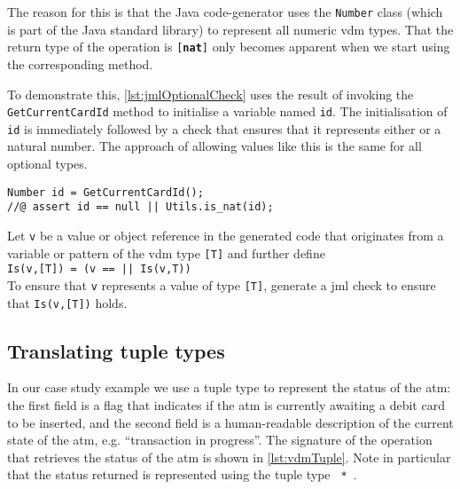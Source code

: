 \noindent The reason for this is that the Java code-generator uses the
\texttt{Number} class (which is part of the Java standard library) to
represent all numeric \ac{vdm} types. That the return type of the
operation is \texttt{[\textbf{nat}]} only becomes apparent when we
start using the corresponding method.

To demonstrate this, \autoref{lst:jmlOptionalCheck} uses the result of invoking the
\texttt{GetCurrentCardId} method to initialise a variable named
\texttt{id}. The initialisation of \texttt{id} is immediately followed
by a check that ensures that it represents either  or a
natural number. The approach of allowing  values like this is
the same for all optional types.


\begin{lstlisting}[style=customJml,caption={Use of the
\texttt{GetCurrentCardId} method in the generated
code.},label={lst:jmlOptionalCheck}]
Number id = GetCurrentCardId();
//@ assert id == null || Utils.is_nat(id);
\end{lstlisting}

 {Let \texttt{v} be a value or
  object reference in the generated code that originates from a
  variable or pattern of the \ac{vdm} type \texttt{[T]} and further define\\
  \texttt{Is(v,[T]) = (v ==  || Is(v,T))}\\
  To ensure that \texttt{v} represents a value of type \texttt{[T]},
  generate a \ac{jml} check to ensure that \texttt{Is(v,[T])} holds.}

\subsection{Translating tuple types}
\label{sec:tuples}

In our case study example we use a tuple type to represent the status
of the \ac{atm}: the first field is a  flag that indicates
if the \ac{atm} is currently awaiting a debit card to be inserted, and
the second field is a human-readable description of the current state
of the \ac{atm}, e.g. ``transaction in progress''. The signature of
the operation that retrieves the status of the \ac{atm} is shown in
\autoref{lst:vdmTuple}. Note in particular that the status returned is
represented using the tuple type \texttt{ * }.

